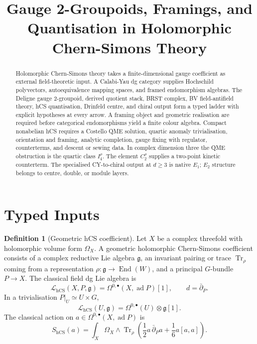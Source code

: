 \documentclass[11pt]{amsart}
\title{Gauge 2-Groupoids, Framings, and Quantisation in Holomorphic Chern-Simons Theory}
\author{}
\date{}
\theoremstyle{plain}
\theoremstyle{definition}
\newtheorem{definition}[theorem]{Definition}
\theoremstyle{remark}
\providecommand{\cL}{\mathcal{L}}
\providecommand{\fg}{\mathfrak{g}}
\providecommand{\End}{\operatorname{End}}
\providecommand{\Tr}{\operatorname{Tr}}
\providecommand{\hCS}{\operatorname{hCS}}
\providecommand{\dbar}{\bar\partial}
\providecommand{\Eone}{E_1}
\providecommand{\Etwo}{E_2}
\begin{document}
\maketitle

\begin{abstract}
Holomorphic Chern-Simons theory takes a finite-dimensional gauge
coefficient as external field-theoretic input. A Calabi-Yau dg category
supplies Hochschild polyvectors, autoequivalence mapping spaces, and
framed endomorphism algebras. The Deligne gauge 2-groupoid, derived
quotient stack, BRST complex, BV field-antifield theory, hCS
quantisation, Drinfeld centre, and chiral output form a typed ladder
with explicit hypotheses at every arrow. A framing object and geometric
realisation are required before categorical endomorphisms yield a
finite colour algebra. Compact nonabelian hCS requires a Costello QME
solution, quartic anomaly trivialisation, orientation and framing,
analytic completion, gauge fixing with regulator, counterterms, and
descent or sewing data. In complex dimension three the QME obstruction
is the quartic class \(I_4^\rho\). The element \(C_2^\rho\) supplies a
two-point kinetic counterterm. The specialised CY-to-chiral output at
\(d\geq3\) is native \(\Eone\); \(\Etwo\) structure belongs to centre,
double, or module layers.
\end{abstract}

\tableofcontents

\section{Typed Inputs}
\label{sec:typed-inputs}

\begin{definition}[Geometric hCS coefficient]
\label{def:hcs-coefficient}
Let \(X\) be a complex threefold with holomorphic volume form
\(\Omega_X\). A geometric holomorphic Chern-Simons coefficient consists
of a complex reductive Lie algebra \(\fg\), an invariant pairing or trace
\(\Tr_\rho\) coming from a representation
\(\rho:\fg\to\End(W)\), and a principal \(G\)-bundle \(P\to X\). The
classical field dg Lie algebra is
\[
  \cL_{\hCS}(X,P,\fg)
  =
  \Omega^{0,\bullet}(X,\operatorname{ad}P)[1],
  \qquad d=\dbar_P .
\]
In a trivialisation \(P|_U\simeq U\times G\),
\[
  \cL_{\hCS}(U,\fg)
  =
  \Omega^{0,\bullet}(U)\otimes\fg[1].
\]
The classical action on \(a\in\Omega^{0,\bullet}(X,\operatorname{ad}P)\)
is
\[
  S_{\hCS}(a)
  =
  \int_X \Omega_X\wedge
  \Tr_\rho\!\left(
    \frac12 a\,\dbar_Pa+\frac16 a[a,a]
  \right).
\]
\end{definition}
\end{document}
